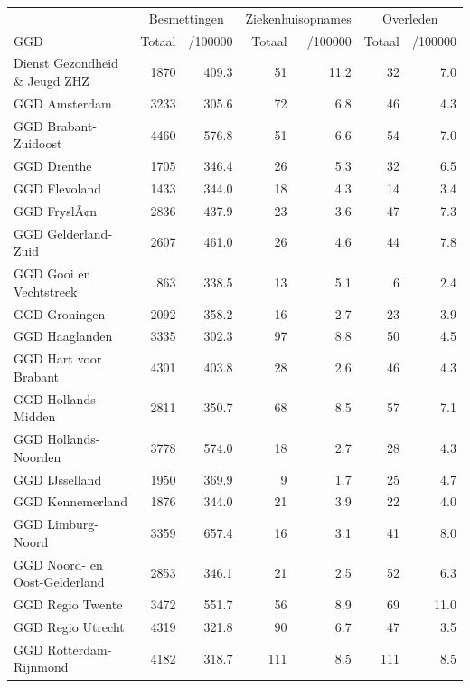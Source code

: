 \documentclass[
  english,
  man,floatsintext]{apa6}
\begin{document}
\begin{table}[H]
\centering\begingroup\fontsize{10}{12}\selectfont

\begin{threeparttable}
\begin{tabular}{lrrrrrr}
\toprule
\multicolumn{1}{c}{ } & \multicolumn{2}{c}{Besmettingen} & \multicolumn{2}{c}{Ziekenhuisopnames} & \multicolumn{2}{c}{Overleden} \\
\cmidrule(l{3pt}r{3pt}){2-3} \cmidrule(l{3pt}r{3pt}){4-5} \cmidrule(l{3pt}r{3pt}){6-7}
GGD & Totaal & /100000 & Totaal & /100000 & Totaal & /100000\\
\midrule
Dienst Gezondheid \& Jeugd ZHZ & 1870 & 409.3 & 51 & 11.2 & 32 & 7.0\\
GGD Amsterdam & 3233 & 305.6 & 72 & 6.8 & 46 & 4.3\\
GGD Brabant-Zuidoost & 4460 & 576.8 & 51 & 6.6 & 54 & 7.0\\
GGD Drenthe & 1705 & 346.4 & 26 & 5.3 & 32 & 6.5\\
GGD Flevoland & 1433 & 344.0 & 18 & 4.3 & 14 & 3.4\\
GGD FryslÃ¢n & 2836 & 437.9 & 23 & 3.6 & 47 & 7.3\\
GGD Gelderland-Zuid & 2607 & 461.0 & 26 & 4.6 & 44 & 7.8\\
GGD Gooi en Vechtstreek & 863 & 338.5 & 13 & 5.1 & 6 & 2.4\\
GGD Groningen & 2092 & 358.2 & 16 & 2.7 & 23 & 3.9\\
GGD Haaglanden & 3335 & 302.3 & 97 & 8.8 & 50 & 4.5\\
GGD Hart voor Brabant & 4301 & 403.8 & 28 & 2.6 & 46 & 4.3\\
GGD Hollands-Midden & 2811 & 350.7 & 68 & 8.5 & 57 & 7.1\\
GGD Hollands-Noorden & 3778 & 574.0 & 18 & 2.7 & 28 & 4.3\\
GGD IJsselland & 1950 & 369.9 & 9 & 1.7 & 25 & 4.7\\
GGD Kennemerland & 1876 & 344.0 & 21 & 3.9 & 22 & 4.0\\
GGD Limburg-Noord & 3359 & 657.4 & 16 & 3.1 & 41 & 8.0\\
GGD Noord- en Oost-Gelderland & 2853 & 346.1 & 21 & 2.5 & 52 & 6.3\\
GGD Regio Twente & 3472 & 551.7 & 56 & 8.9 & 69 & 11.0\\
GGD Regio Utrecht & 4319 & 321.8 & 90 & 6.7 & 47 & 3.5\\
GGD Rotterdam-Rijnmond & 4182 & 318.7 & 111 & 8.5 & 111 & 8.5\\

\end{tabular}
\end{threeparttable}
\end{table}
\end{document}

